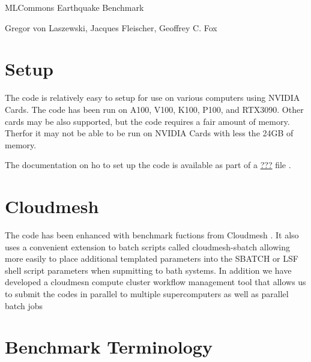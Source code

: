 \documentclass[11pt,twocolumn]{article}
\title{\TITLE}
\author{\AUTHOR}
\newcommand{\TITLE}{MLCommons Earthquake Benchmark}
\newcommand{\AUTHOR}{Gregor von Laszewski, Jacques Fleischer, Geoffrey C. Fox}
\begin{document}
\onecolumn
\begin{center}
{\huge \TITLE}

{\AUTHOR}
\end{center}

\tableofcontents
\twocolumn


\maketitle

\begin{abstract}

  We report hee the results of the MLCommonse Science Workinggroup benchmark of the Eearthquake code.

\end{abstract}

\section{Setup}

The code is relatively easy to setup for use on various computers
using NVIDIA Cards.  The code has been run on A100, V100, K100, P100,
and RTX3090. Other cards may be also supported, but the code requires
a fair amount of memory. Therfor it may not be able to be run on
NVIDIA Cards with less the 24GB of memory.

The documentation on ho to set up the code is available as part of a
\href{README.md}{???} file \cite{???}.


\section{Cloudmesh}

The code has been enhanced with benchmark fuctions from Cloudmesh
\cite{}. It also uses a convenient extension to batch scripts called
cloudmesh-sbatch allowing more easily to place additional templated
parameters into the SBATCH or LSF shell script parameters when
supmitting to bath systems. In addition we have developed a cloudmesn
compute cluster workflow management tool that allows us to submit the
codes in parallel to multiple supercomputers as well as parallel batch
jobs \cite{las-cc,las21openapi}

\section{Benchmark Terminology}
\end{document}
